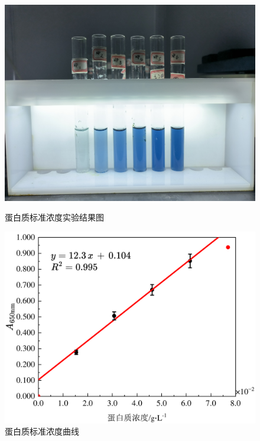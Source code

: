 \begin{figure}[H]
    \begin{minipage}[t]{0.48\textwidth}
        \includegraphics[width = \textwidth]{figure/1124/Pro_STD.jpg}
        \caption{蛋白质标准浓度实验结果图}
        \label{fig:STD_Protein_result}
    \end{minipage}
    \begin{minipage}[t]{0.50\textwidth}
        \includegraphics[width = \textwidth]{figure/1124/Protein_STD.pdf}
        \caption{蛋白质标准浓度曲线}
        \label{fig:STD_Protein}
    \end{minipage}
\end{figure}

